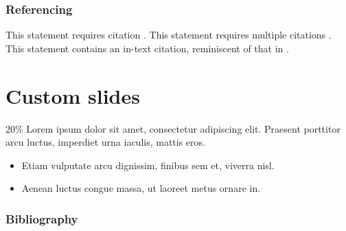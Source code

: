 \documentclass[
	aspectratio=169, %
	12pt, %
	t, %
]{beamer}
\begin{document}
\begin{frame}
	\frametitle{Referencing}

	This statement requires citation \autocite{Smith:2019qr}. This statement requires multiple citations \autocite{Smith:2019qr, Smith:2021jd}. This statement contains an in-text citation, reminiscent of that in \textcite{Smith:2021jd}.
\end{frame}


\section{Custom slides}




\begin{bignumframe}{20\%} %
	Lorem ipsum dolor sit amet, consectetur adipiscing elit. Praesent porttitor arcu luctus, imperdiet urna iaculis, mattis eros.

	\bigskip

	\begin{itemize}
		\item Etiam vulputate arcu dignissim, finibus sem et, viverra nisl.
		\item Aenean luctus congue massa, ut laoreet metus ornare in.
	\end{itemize}
\end{bignumframe}


\begin{frame}[allowframebreaks] %
	\frametitle{Bibliography}

	\printbibliography[heading=none]
\end{frame}
\end{document}
